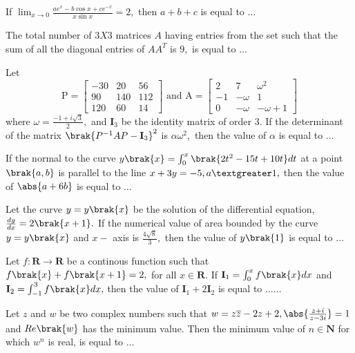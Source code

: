     \item If $\lim_{x \to 0}\frac{ae^x-b\cos x+ce^{-x}}{x\sin x}=2,$ then $a+b+c$ is equal to $\dots$
	    \hfill{} \\
    \item The total number of $3 X 3$ matrices $A$ having entries from the set  such that the sum of all the diagonal entries of $AA^T$ is $9,$ is equal to $\dots$
	    \hfill{}\\
    \item Let $$\text{P} = \begin{bmatrix}
-30 & 20  & 56 \\
90  & 140 & 112 \\
120 & 60  & 14
\end{bmatrix} \text{ and A} =
\begin{bmatrix}
2  & 7  & \omega^2 \\
-1 & -\omega & 1 \\
0  & -\omega & -\omega + 1
\end{bmatrix}$$ where $\omega =\frac{-1+i\sqrt{3}}{2},$ and $\textbf{I}_3$ be the identity matrix of order $3.$ If the determinant of the matrix $\brak{P^{-1}AP-\textbf{I}_3}^2$ is $\alpha\omega^2,$ then the value of $\alpha$ is equal to $\dots$
		\hfill{}\\
\item If the normal to the curve $y\brak{x}=\int_0^x\brak{2t^2-15t+10t}dt$ at a point $\brak{a,b}$ is parallel to the line $x+3y=-5, a\textgreater 1,$ then the value of $\abs{a+6b}$ is equal to $\dots$
	\hfill{}\\
\item Let the curve $y=y\brak{x}$ be the solution of the differential equation, $\frac{dy}{dx}=2\brak{x+1}.$ If the numerical value of area bounded by the curve $y=y\brak{x}$ and $x-$ axis is $\frac{4\sqrt{8}}{3},$ then the value of $y\brak{1}$ is equal to $\dots$
	\hfill{}\\
\item Let $f : \textbf{R} \to \textbf{R}$ be a continous function such that $f\brak{x}+f\brak{x+1}=2,$ for all $x \in \textbf{R}.$ If $\textbf{I}_1=\int_0^xf\brak{x}dx$ and $\textbf{I}_2=\int_{-1}^3f\brak{x}dx,$ then the value of $\textbf{I}_1 +2\textbf{I}_2$ is equal to $\dots\dots$ \hfill{}\\
\item Let $z$ and $w$ be two complex numbers such that $w=z\overline{z}-2z+2, \abs{\frac{z+i}{z-3i}}=1$ and $Re\brak{w}$ has the minimum value. Then the minimum value of $n \in \textbf{N}$ for which $w^n$ is real, is equal to $\dots$
	\hfill{}

